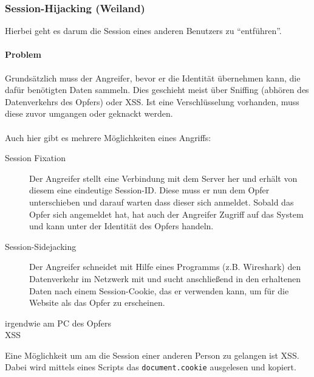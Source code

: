 \subsubsection{Session-Hijacking (Weiland)}
\label{sec:content_security_session-hijacking}
Hierbei geht es darum die Session eines anderen Benutzers zu \enquote{entführen}. 
\paragraph{Problem}
Grundsätzlich muss der Angreifer, bevor er die Identität übernehmen kann, die dafür benötigten Daten sammeln. Dies geschieht meist über Sniffing (abhören des Datenverkehrs des Opfers) oder XSS. Ist eine Verschlüsselung vorhanden, muss diese zuvor umgangen oder geknackt werden.\\\\
Auch hier gibt es mehrere Möglichkeiten eines Angriffs:
\begin{description}
\item[Session Fixation] Der Angreifer stellt eine Verbindung mit dem Server her und erhält von diesem eine eindeutige Session-ID. Diese muss er nun dem Opfer unterschieben und darauf warten dass dieser sich anmeldet. Sobald das Opfer sich angemeldet hat, hat auch der Angreifer Zugriff auf das System und kann unter der Identität des Opfers handeln.
\item[Session-Sidejacking] Der Angreifer schneidet mit Hilfe eines Programms (z.B. Wireshark) den Datenverkehr im Netzwerk mit und sucht anschließend in den erhaltenen Daten nach einem Session-Cookie, das er verwenden kann, um für die Website als das Opfer zu erscheinen.
\item[irgendwie am PC des Opfers]
\item[XSS] 
\end{description}
Eine Möglichkeit um am die Session einer anderen Person zu gelangen ist XSS. Dabei wird mittels eines Scripts das \texttt{document.cookie} ausgelesen und kopiert.


